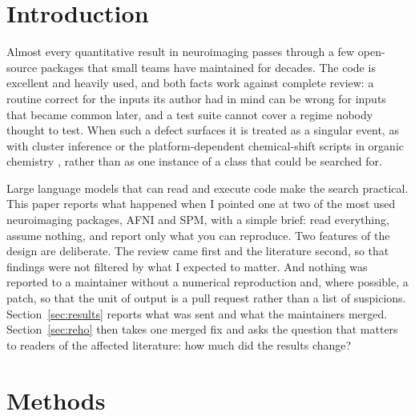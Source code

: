 \documentclass[11pt]{article}
\begin{document}
\section{Introduction}
Almost every quantitative result in neuroimaging passes through a few open-source packages that small teams have maintained for decades. The code is excellent and heavily used, and both facts work against complete review: a routine correct for the inputs its author had in mind can be wrong for inputs that became common later, and a test suite cannot cover a regime nobody thought to test. When such a defect surfaces it is treated as a singular event, as with cluster inference \cite{eklund2016} or the platform-dependent chemical-shift scripts in organic chemistry \cite{neupane2019}, rather than as one instance of a class that could be searched for.

Large language models that can read and execute code make the search practical. This paper reports what happened when I pointed one at two of the most used neuroimaging packages, AFNI \cite{cox1996} and SPM, with a simple brief: read everything, assume nothing, and report only what you can reproduce. Two features of the design are deliberate. The review came first and the literature second, so that findings were not filtered by what I expected to matter. And nothing was reported to a maintainer without a numerical reproduction and, where possible, a patch, so that the unit of output is a pull request rather than a list of suspicions. Section~\ref{sec:results} reports what was sent and what the maintainers merged. Section~\ref{sec:reho} then takes one merged fix and asks the question that matters to readers of the affected literature: how much did the results change?

\section{Methods}
\end{document}
